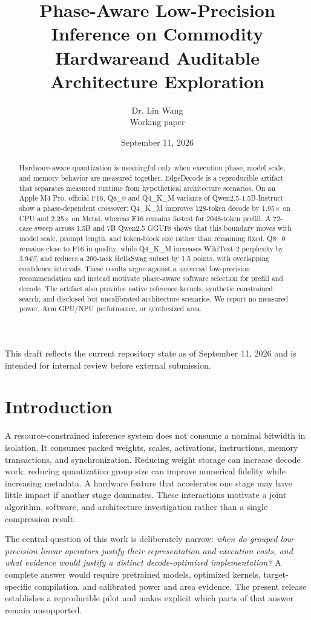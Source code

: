 \documentclass[11pt]{article}
\title{Phase-Aware Low-Precision Inference on Commodity Hardware\newline and Auditable Architecture Exploration}
\author{Dr. Lin Wang\\\small Working paper}
\date{September 11, 2026}
\begin{document}
\maketitle
\noindent\small This draft reflects the current repository state as of September 11, 2026 and is intended for internal review before external submission.
\begin{abstract}
Hardware-aware quantization is meaningful only when execution phase, model scale,
and memory behavior are measured together. EdgeDecode is a reproducible artifact
that separates measured runtime from hypothetical architecture scenarios. On an
Apple M4 Pro, official F16, Q8\_0 and Q4\_K\_M variants of Qwen2.5-1.5B-Instruct
show a phase-dependent crossover: Q4\_K\_M improves 128-token decode by 1.95$\times$
on CPU and 2.25$\times$ on Metal, whereas F16 remains fastest for 2048-token
prefill. A 72-case sweep across 1.5B and 7B Qwen2.5 GGUFs shows that this
boundary moves with model scale, prompt length, and token-block size rather than
remaining fixed. Q8\_0 remains close to F16 in quality, while Q4\_K\_M increases
WikiText-2 perplexity by 3.94\% and reduces a 200-task HellaSwag subset by 1.5
points, with overlapping confidence intervals. These results argue against a
universal low-precision recommendation and instead motivate phase-aware software
selection for prefill and decode. The artifact also provides native reference
kernels, synthetic constrained search, and \ScenarioCount{} disclosed but
uncalibrated architecture scenarios. We report no measured power, Arm GPU/NPU
performance, or synthesized area.
\end{abstract}

\section{Introduction}
A resource-constrained inference system does not consume a nominal bitwidth in
isolation. It consumes packed weights, scales, activations, instructions, memory
transactions, and synchronization. Reducing weight storage can increase decode
work; reducing quantization group size can improve numerical fidelity while
increasing metadata. A hardware feature that accelerates one stage may have little
impact if another stage dominates. These interactions motivate a joint algorithm,
software, and architecture investigation rather than a single compression result.

The central question of this work is deliberately narrow: \emph{when do grouped
low-precision linear operators justify their representation and execution costs,
and what evidence would justify a distinct decode-optimized implementation?} A
complete answer would require pretrained models, optimized kernels,
target-specific compilation, and calibrated power and area evidence. The present
release establishes a reproducible pilot and makes explicit which parts of that
answer remain unsupported.
\end{document}
